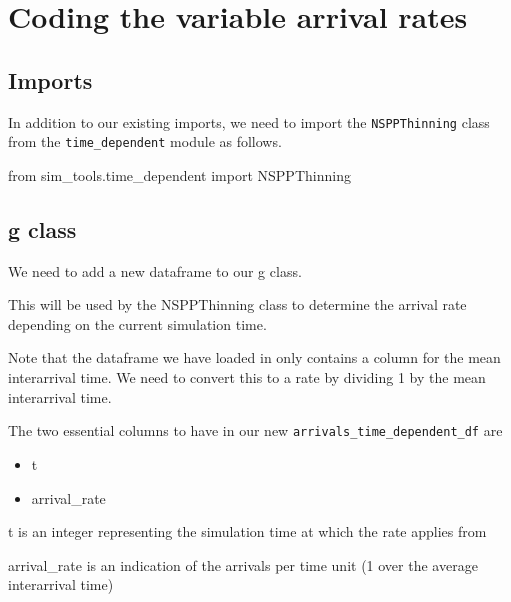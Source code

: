 \documentclass[
  letterpaper,
  DIV=11,
  numbers=noendperiod]{scrreprt}
\newenvironment{Shaded}{\begin{snugshade}}{\end{snugshade}}
\newcommand{\ImportTok}[1]{\textcolor[rgb]{0.00,0.46,0.62}{#1}}
\newcommand{\NormalTok}[1]{\textcolor[rgb]{0.00,0.23,0.31}{#1}}
\providecommand{\tightlist}{%
  \setlength{\itemsep}{0pt}\setlength{\parskip}{0pt}}\usepackage{longtable,booktabs,array}
\begin{document}
\section{Coding the variable arrival
rates}\label{coding-the-variable-arrival-rates}

\subsection{Imports}\label{imports}

In addition to our existing imports, we need to import the
\texttt{NSPPThinning} class from the \texttt{time\_dependent} module as
follows.

\begin{Shaded}
\begin{Highlighting}[]
\ImportTok{from}\NormalTok{ sim\_tools.time\_dependent }\ImportTok{import}\NormalTok{ NSPPThinning}
\end{Highlighting}
\end{Shaded}

\subsection{g class}\label{g-class-3}

We need to add a new dataframe to our g class.

This will be used by the NSPPThinning class to determine the arrival
rate depending on the current simulation time.

Note that the dataframe we have loaded in only contains a column for the
mean interarrival time. We need to convert this to a rate by dividing 1
by the mean interarrival time.

\begin{tcolorbox}[enhanced jigsaw, rightrule=.15mm, colback=white, colframe=quarto-callout-tip-color-frame, colbacktitle=quarto-callout-tip-color!10!white, toprule=.15mm, coltitle=black, opacityback=0, titlerule=0mm, bottomtitle=1mm, breakable, title=\textcolor{quarto-callout-tip-color}{\faLightbulb}\hspace{0.5em}{Tip}, opacitybacktitle=0.6, toptitle=1mm, arc=.35mm, bottomrule=.15mm, leftrule=.75mm, left=2mm]

The two essential columns to have in our new
\texttt{arrivals\_time\_dependent\_df} are

\begin{itemize}
\tightlist
\item
  t
\item
  arrival\_rate
\end{itemize}

t is an integer representing the simulation time at which the rate
applies from

arrival\_rate is an indication of the arrivals per time unit (1 over the
average interarrival time)

\end{tcolorbox}
\end{document}
